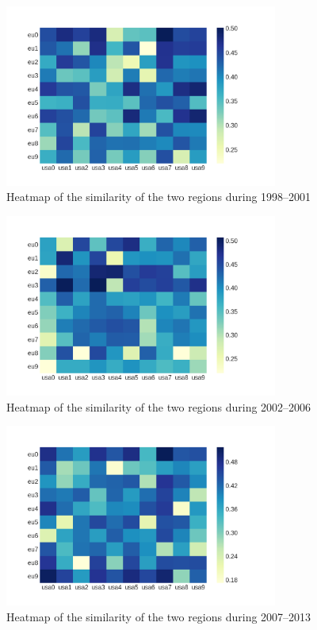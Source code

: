 \documentclass[12pt]{report}
\begin{document}
\begin{figure}[H]
\centering
\includegraphics[width=0.8\textwidth]
{figs/heatmaps/heatmapFP5.png}
\caption{Heatmap of the similarity of the two regions during 1998--2001}
\label{heatmap5}
\end{figure}

\begin{figure}[H]
\centering
\includegraphics[width=0.8\textwidth]
{figs/heatmaps/heatmapFP6.png}
\caption{Heatmap of the similarity of the two regions during 2002--2006}
\label{heatmap6}
\end{figure}

\begin{figure}[H]
\centering
\includegraphics[width=0.8\textwidth]
{figs/heatmaps/heatmapFP7.png}
\caption{Heatmap of the similarity of the two regions during 2007--2013}
\label{heatmap7}
\end{figure}
\end{document}
